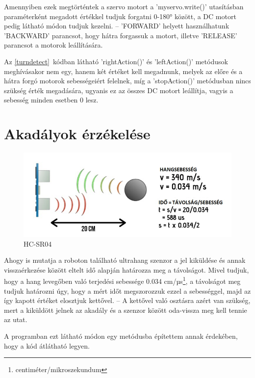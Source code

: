 \documentclass[]{thesis-ekf}
\theoremstyle{definition}
\begin{document}
Amennyiben ezek megtörténtek a szervo motort a 'myservo.write()' utasításban paraméterként megadott értékkel tudjuk forgatni 0-180° között, a DC motort pedig  látható módon tudjuk kezelni. -- 'FORWARD' helyett használhatunk 'BACKWARD' parancsot, hogy hátra forgassuk a motort, illetve 'RELEASE' parancsot a motorok leállítására. 

Az \ref{turndetect}~kódban látható 'rightAction()' és 'leftAction()' metódusok meghívásakor nem egy, hanem két értéket kell megadnunk, melyek az előre és a hátra forgó motorok sebességeiért felelnek, míg a 'stopAction()' metódusban nincs szükség érték megadására, ugyanis ez az összes DC motort leállítja, vagyis a sebesség minden esetben 0 lesz.

\section{Akadályok érzékelése}
\begin{figure} [!h]
	\includegraphics[width=\columnwidth]{images/ultrasonic}
	\caption{HC-SR04}
	\label{ultrahang}
\end{figure}
Ahogy  is mutatja a roboton található ultrahang szenzor a jel kiküldése és annak visszaérkezése között eltelt idő alapján határozza meg a távolságot. Mivel tudjuk, hogy a hang levegőben való terjedési sebessége 0.034 cm/µs\footnote{centiméter/mikroszekundum}, a távolságot meg tudjuk határozni úgy, hogy a mért időt megszorozzuk ezzel a sebességgel, majd az így kapott értéket elosztjuk kettővel. -- A kettővel való osztásra azért van szükség, mert a kiküldött jelnek az akadály és a szenzor között oda-vissza meg kell tennie az utat.

A programban ezt  látható módon egy metódusba építettem annak érdekében, hogy a kód átlátható legyen.

\end{document}
